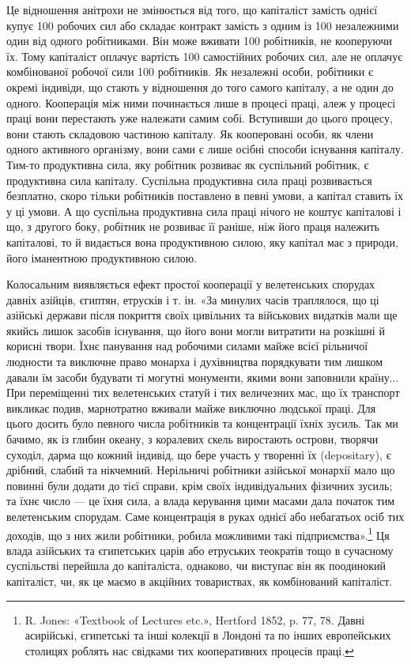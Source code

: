 \parcont{}  %
Це відношення анітрохи не змінюється від того, що капіталіст
замість однієї купує 100 робочих сил або складає контракт замість
з одним із 100 незалежними один від одного робітниками. Він може
вживати 100 робітників, не кооперуючи їх. Тому капіталіст
оплачує вартість 100 самостійних робочих сил, але не оплачує
комбінованої робочої сили 100 робітників. Як незалежні особи,
робітники є окремі індивіди, що стають у відношення до того
самого капіталу, а не один до одного. Кооперація між ними починається
лише в процесі праці, алеж у процесі праці вони перестають
уже належати самим собі. Вступивши до цього процесу,
вони стають складовою частиною капіталу. Як кооперовані
особи, як члени одного активного організму, вони сами є лише
осібні способи існування капіталу. Тим-то продуктивна сила,
яку робітник розвиває як суспільний робітник, є продуктивна
сила капіталу. Суспільна продуктивна сила праці розвивається
безплатно, скоро тільки робітників поставлено в певні умови,
а капітал ставить їх у ці умови. А що суспільна продуктивна
сила праці нічого не коштує капіталові і що, з другого боку, робітник
не розвиває її раніше, ніж його праця належить капіталові,
то й видається вона продуктивною силою, яку капітал має з
природи, його іманентною продуктивною силою.

Колосальним виявляється ефект простої кооперації у велетенських
спорудах давніх азійців, єгиптян, етрусків і т. ін.
«За минулих часів траплялося, що ці азійські держави після
покриття своїх цивільних та військових видатків мали ще якийсь
лишок засобів існування, що його вони могли витратити на розкішні
й корисні твори. Їхнє панування над робочими силами майже
всієї рільничої людности та виключне право монарха і духівництва
порядкувати тим лишком давали їм засоби будувати ті
могутні монументи, якими вони заповнили країну... При переміщенні
тих велетенських статуй і тих величезних мас, що їх
транспорт викликає подив, марнотратно вживали майже виключно
людської праці. Для цього досить було певного числа робітників
та концентрації їхніх зусиль. Так ми бачимо, як із глибин океану,
з коралевих скель виростають острови, творячи суходіл, дарма
що кожний індивід, що бере участь у творенні їх (depositary),
є дрібний, слабий та нікчемний. Нерільничі робітники азійської
монархії мало що повинні були додати до тієї справи, крім
своїх індивідуальних фізичних зусиль; та їхнє число — це їхня
сила, а влада керування цими масами дала початок тим велетенським
спорудам. Саме концентрація в руках однієї або небагатьох
осіб тих доходів, що з них жили робітники, робила можливими
такі підприємства».\footnote{
R. Jones: «Textbook of Lectures etc.», Hertford 1852, p. 77, 78.
Давні асирійські, єгипетські та інші колекції в Лондоні та по інших
европейських столицях роблять нас свідками тих кооперативних процесів
праці.
} Ця влада азійських та єгипетських царів
або етруських теократів тощо в сучасному суспільстві перейшла
до капіталіста, однаково, чи виступає він як поодинокий капіталіст,
чи, як це маємо в акційних товариствах, як комбінований
капіталіст.


